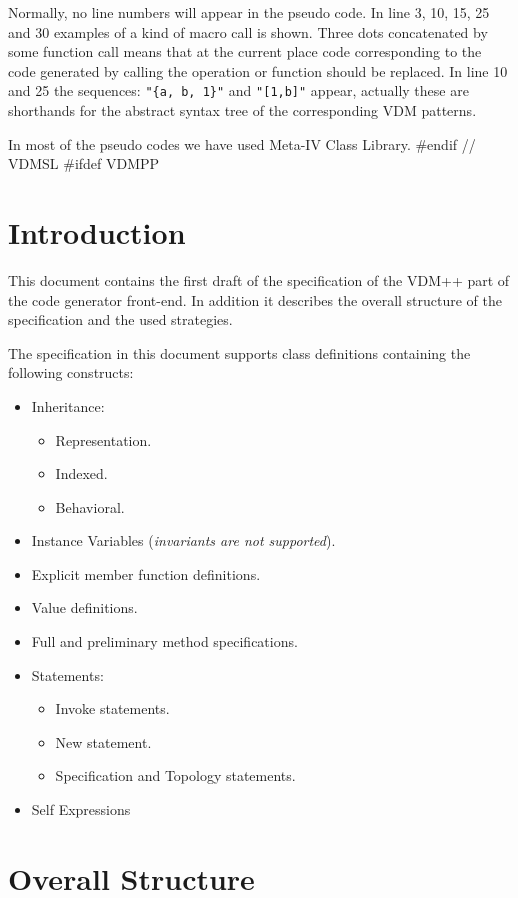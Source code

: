 \documentclass[a4paper,dvips]{article}
\newcommand{\MCL}{Meta-IV Class Library}
\begin{document}
Normally, no line numbers will appear in the pseudo code.  In line 3,
10, 15, 25 and 30 examples of a kind of macro call is shown. Three
dots concatenated by some function call means that at the current
place code corresponding to the code generated by calling the
operation or function should be replaced.  In line 10 and 25 the
sequences: {\tt "\{a, b, 1\}"} and {\tt "[1,b]"} appear, actually
these are shorthands for the abstract syntax tree of the corresponding
VDM patterns.

In most of the pseudo codes we have used \MCL{}.
#endif // VDMSL
#ifdef VDMPP
\section{Introduction}

This document contains the first draft of the specification
of the VDM++ part of the code generator front-end. In addition
it describes the overall structure of the specification and
the used strategies. 

The specification in this document supports class definitions
containing the following constructs:

\begin{itemize}
\item Inheritance:
  \begin{itemize}
  \item Representation.
  \item Indexed.
  \item Behavioral.
  \end{itemize}
\item Instance Variables ({\em invariants are not supported}).
\item Explicit member function definitions.
\item Value definitions.
\item Full and preliminary method specifications.
\item Statements:
  \begin{itemize}
  \item Invoke statements.
  \item New statement.
  \item Specification and Topology statements.
  \end{itemize}
\item Self Expressions
 \end{itemize}



\section{Overall Structure}
\end{document}
